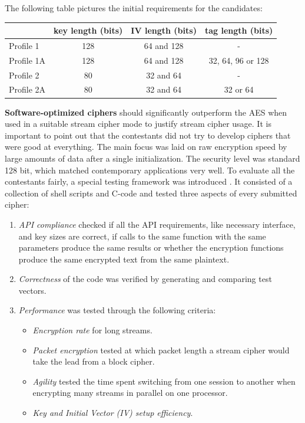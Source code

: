 The following table pictures the initial requirements for the candidates:
\begin{table}[h!]
	\centering
	\begin{tabular}{|l c c c|} 
		\hline
		& key length (bits) & IV length (bits) & tag length (bits) \\ [0.5ex] 
		\hline
		Profile 1 & 128 & 64 and 128 & - \\ 
		Profile 1A & 128 & 64 and 128 & 32, 64, 96 or 128 \\
		Profile 2 & 80 & 32 and 64 & - \\
		Profile 2A & 80 & 32 and 64 & 32 or 64 \\[1ex] 
		\hline
	\end{tabular}
	\label{table:Initial requirements for the candidates}
	\vspace{0.3cm}
\end{table}

\textbf{Software-optimized ciphers} should significantly outperform the AES when used in a suitable stream cipher mode to justify stream cipher usage. It is important to point out that the contestants did not try to develop ciphers that were good at everything. The main focus was laid on raw encryption speed by large amounts of data after a single initialization. The security level was standard 128 bit, which matched contemporary applications very well.
To evaluate all the contestants fairly, a special testing framework was introduced \cite{canniere2008estream}. It consisted of a collection of shell scripts and C-code and tested three aspects of every submitted cipher:
\begin{enumerate}
	\item \emph{API compliance} checked if all the API requirements, like necessary interface, and key sizes are correct, if calls to the same function with the same parameters produce the same results or whether the encryption functions produce the same encrypted text from the same plaintext. 
	\item \emph{Correctness} of the code was verified by generating and comparing test vectors.
	\item \emph{Performance} was tested through the following criteria:
	\begin{itemize}
		\item \emph{Encryption rate} for long streams.
		\item\emph{Packet encryption} tested at which packet length a stream cipher would take the lead from a block cipher.
		\item \emph{Agility} tested the time spent switching from one session to another when encrypting many streams in parallel on one processor.
		\item \emph{Key and Initial Vector (IV) setup efficiency}.
	\end{itemize}
\end{enumerate}

